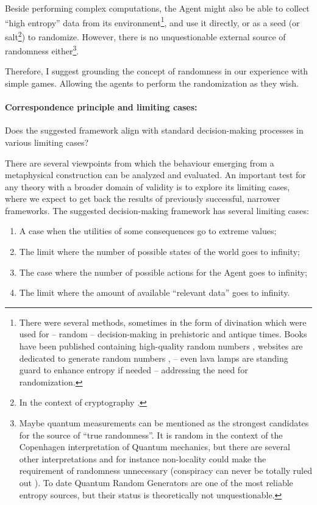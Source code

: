 \documentclass{article}
\begin{document}
Beside performing complex computations, the Agent might also be able to collect ``high entropy'' data from its environment\footnote{There were several methods, sometimes in the form of divination \cite{paper:DivinationArticle} which were used for -- random -- decision-making in prehistoric and antique times. Books have been published containing high-quality random numbers \cite{book:RandomDigits,book:RandomDigits2022}, websites are dedicated to generate random numbers \cite{web:random.org,web:drand,web:hotbits}, -- even lava lamps are standing guard to enhance entropy if needed \cite{web:Lavarand} -- addressing the need for randomization.}, and use it directly, or as a seed (or salt\footnote{In the context of cryptography \cite{web:rfc4086RandomSeed,book:CryptographicSecurityArchitecture}.}) to randomize. However, there is no unquestionable external source of randomness either\footnote{Maybe quantum measurements can be mentioned as the strongest candidates for the source of ``true randomness''. It is random in the context of the Copenhagen interpretation of Quantum mechanics, but there are several other interpretations and for instance non-locality could make the requirement of randomness unnecessary (conspiracy can never be totally ruled out \cite{book:tHooftCellularAutomaton}). To date Quantum Random Generators \cite{paper:QuantumRandomNumberGenerators,paper:QRandomNumbers} are one of the most reliable entropy sources, but their status is theoretically not unquestionable.}.

Therefore, I suggest grounding the concept of randomness in our experience with simple games. Allowing the agents to perform the randomization as they wish.

\paragraph{Correspondence principle and limiting cases:}
Does the suggested framework align with standard decision-making processes in various limiting cases?

There are several viewpoints from which the behaviour emerging from a metaphysical construction can be analyzed and evaluated. An important test for any theory with a broader domain of validity is to explore its limiting cases, where we expect to get back the results of previously successful, narrower frameworks. The suggested decision-making framework has several limiting cases:

\begin{enumerate}
    \item A case when the utilities of some consequences go to extreme values;
    \item The limit where the number of possible states of the world goes to infinity;
    \item The case where the number of possible actions for the Agent goes to infinity;
    \item The limit where the amount of available ``relevant data'' goes to infinity.
\end{enumerate}
\end{document}
